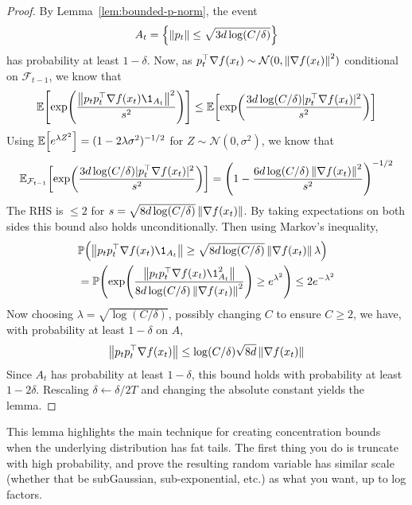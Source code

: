     \begin{proof}
        By Lemma~\ref{lem:bounded-p-norm}, the event
        \begin{align*}
            A_t = \left\{\left\lVert p_t \right\rVert \leq \sqrt{3d\log(C/\delta)}\right\} 
        \end{align*}
        has probability at least $1-\delta$. Now, as $p_t^\top \nabla f(x_t) \sim \mathcal N(0, \left\lVert \nabla f(x_t) \right\rVert^2)$ conditional on $\mathcal F_{t-1}$, we know that
        \begin{align*}
            \E[\exp(\frac{\mg{p_tp_t^\top \grad f(x_t) \1_{A_t}}^2}{s^2})] \leq \E[\exp(\frac{3d \log(C/\delta) |p_t^\top \grad f(x_t)|^2}{s^2})]
        \end{align*}
        Using $\mathbb{E}\qty[e^{\lambda Z^2}] = (1-2\lambda \sigma^2)^{-1/2}$ for $Z \sim \mathcal N(0, \sigma^2)$, we know that
        \begin{align*}
            \mathbb{E}_{\mathcal F_{t-1}}\qty[\exp(\frac{3d \log(C/\delta) |p_t^\top \nabla f(x_t)|^2}{s^2})] = \left(1 - \frac{6d \log(C/\delta)\left\lVert \nabla f(x_t) \right\rVert^2}{s^2}\right)^{-1/2}
        \end{align*}
        The RHS is $\leq 2$ for $s = \sqrt{8d \log(C/\delta)}\left\lVert \nabla f(x_t) \right\rVert$. By taking expectations on both sides this bound also holds unconditionally. Then using Markov's inequality,
        \begin{align*}
            &\P(\mg{p_tp_t^\top \grad f(x_t) \1_{A_t}} \geq \sqrt{8d \log(C/\delta)}\mg{\grad f(x_t)} \lambda) 
            \\&= \P(\exp(\frac{\mg{p_tp_t^\top \grad f(x_t) \1_{A_t}^2}}{8d \log(C/\delta) \mg{\grad f(x_t)}^2}) \geq e^{\lambda^2}) \leq 2e^{-\lambda^2}
        \end{align*}
        Now choosing $\lambda = \sqrt{\log(C/\delta)}$, possibly changing $C$ to ensure $C \geq 2$, we have, with probability at least $1-\delta$ on $A$,
        \begin{align*}
            \left\lVert p_tp_t^\top \nabla f(x_t) \right\rVert \leq \log(C/\delta)\sqrt{8d}\left\lVert \nabla f(x_t) \right\rVert 
        \end{align*}
        Since $A_t$ has probability at least $1-\delta$, this bound holds with probability at least $1-2\delta$. Rescaling $\delta \gets \delta/2T$ and changing the absolute constant yields the lemma.
    \end{proof}
    This lemma highlights the main technique for creating concentration bounds when the underlying distribution has fat tails. The first thing you do is truncate with high probability, and prove the resulting random variable has similar scale (whether that be subGaussian, sub-exponential, etc.) as what you want, up to log factors.

